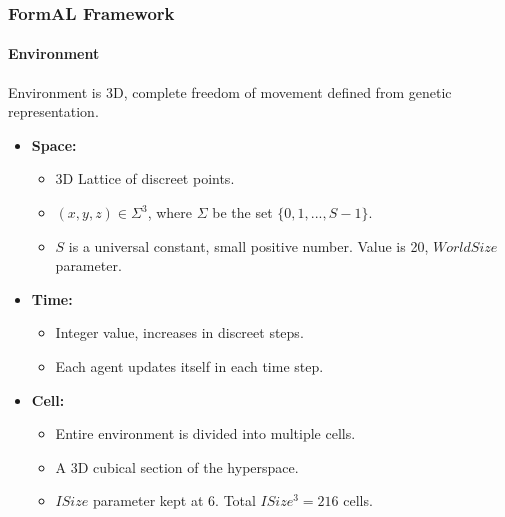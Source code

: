 \frame
{
	\frametitle{FormAL Framework}
	\framesubtitle{Environment}
	
	Environment is 3D, complete freedom of movement defined from genetic representation.
	\begin{itemize}
		\item \textbf{Space:}
			\begin{itemize}
				\item 3D Lattice of discreet points.
				\item \((x,y,z) \in \Sigma^3\), where \(\Sigma\) be the set \(\{0, 1, ..., S-1\}\).
				\item \(S\) is a universal constant, small positive number. Value is 20, \(World Size\) parameter. 
			\end{itemize}
		\item \textbf{Time:}
			\begin{itemize}
				\item Integer value, increases in discreet steps. 
				\item Each agent updates itself in each time step.
			\end{itemize}
		\item \textbf{Cell:}
			\begin{itemize}
				\item Entire environment is divided into multiple cells.
				\item A 3D cubical section of the hyperspace.
				\item \(ISize\) parameter kept at 6. Total \(ISize^3 = 216\) cells.
			\end{itemize}
	\end{itemize}
}

